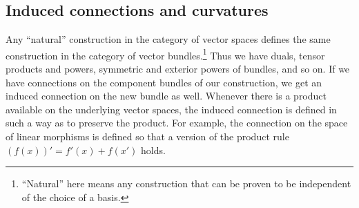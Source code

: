 \documentclass[10pt,a4paper]{article}
\begin{document}
\subsection{Induced connections and curvatures}
\label{sec:induced-connections}

Any ``natural'' construction in the category of vector spaces defines the same construction in the category of vector bundles.\footnote{``Natural'' here means any construction that can be proven to be independent of the choice of a basis.} Thus we have duals, tensor products and powers, symmetric and exterior powers of bundles, and so on. If we have connections on the component bundles of our construction, we get an induced connection on the new bundle as well. Whenever there is a product available on the underlying vector spaces, the induced connection is defined in such a way as to preserve the product. For example, the connection on the space of linear morphisms is defined so that a version of the product rule $(f(x))' = f'(x) + f(x')$ holds.
\end{document}
